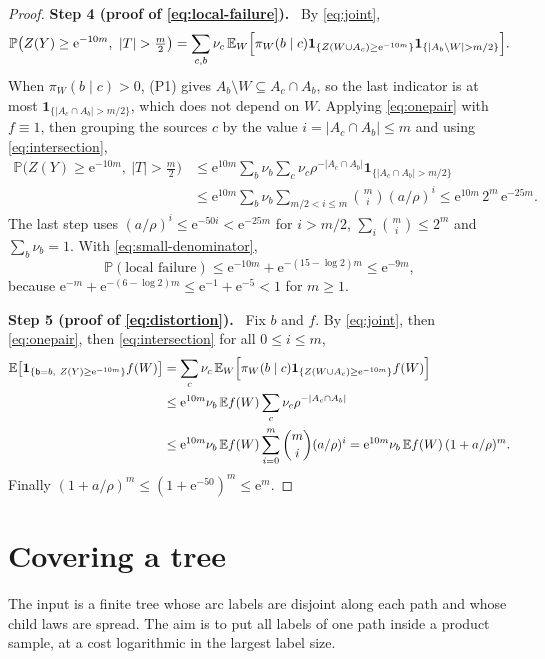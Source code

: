 \documentclass[11pt]{article}
\numberwithin{equation}{section}
\newcommand{\PP}{\mathbb P}
\newcommand{\EE}{\mathbb E}
\newcommand{\ind}{\mathbf 1}
\newcommand{\ee}{\mathrm e}
\newcommand{\tgt}{\mathsf b}
\newcommand{\step}[2]{\par\medskip\noindent\textbf{Step #1 (#2).}\ }
\begin{document}
\begin{proof}
\step{4}{proof of \eqref{eq:local-failure}}
By \eqref{eq:joint},
\[
 \PP\bigl(Z(Y)\ge\ee^{-10m},\ |T|>\tfrac m2\bigr)
 =\sum_{c,b}\nu_c\,\EE_W\Bigl[\pi_W(b\mid c)
   \ind_{\{Z(W\cup A_c)\ge\ee^{-10m}\}}
   \ind_{\{|A_b\setminus W|>m/2\}}\Bigr].
\]
When $\pi_W(b\mid c)>0$, (P1) gives
$A_b\setminus W\subseteq A_c\cap A_b$, so the last indicator is at most
$\ind_{\{|A_c\cap A_b|>m/2\}}$, which does not depend on $W$. Applying
\eqref{eq:onepair} with $f\equiv1$, then grouping the sources $c$ by
the value $i=|A_c\cap A_b|\le m$ and using \eqref{eq:intersection},
\begin{align*}
 \PP\bigl(Z(Y)\ge\ee^{-10m},\ |T|>\tfrac m2\bigr)
 &\le\ee^{10m}\sum_b\nu_b\sum_c\nu_c
 \rho^{-|A_c\cap A_b|}\ind_{\{|A_c\cap A_b|>m/2\}}\\
 &\le\ee^{10m}\sum_b\nu_b\sum_{m/2<i\le m}\binom mi(a/\rho)^i
 \le \ee^{10m}\,2^m\,\ee^{-25m}.
\end{align*}
The last step uses $(a/\rho)^i\le\ee^{-50i}<\ee^{-25m}$ for $i>m/2$,
$\sum_i\binom mi\le2^m$ and $\sum_b\nu_b=1$. With
\eqref{eq:small-denominator},
\[
 \PP(\text{local failure})
 \le\ee^{-10m}+\ee^{-(15-\log 2)m}
 \le\ee^{-9m},
\]
because $\ee^{-m}+\ee^{-(6-\log2)m}\le\ee^{-1}+\ee^{-5}<1$ for
$m\ge1$.

\step{5}{proof of \eqref{eq:distortion}}
Fix $b$ and $f$. By \eqref{eq:joint}, then \eqref{eq:onepair}, then
\eqref{eq:intersection} for all $0\le i\le m$,
\begin{align*}
 \EE\!\left[
 \ind_{\{\tgt=b,\ Z(Y)\ge\ee^{-10m}\}} f(W)\right]
 &=\sum_c\nu_c\,\EE_W\Bigl[\pi_W(b\mid c)
   \ind_{\{Z(W\cup A_c)\ge\ee^{-10m}\}}f(W)\Bigr]\\
 &\le\ee^{10m}\nu_b\,\EE f(W)\sum_c\nu_c\rho^{-|A_c\cap A_b|}\\
 &\le\ee^{10m}\nu_b\,\EE f(W)\sum_{i=0}^m\binom mi(a/\rho)^i
 =\ee^{10m}\nu_b\,\EE f(W)\,(1+a/\rho)^m .
\end{align*}
Finally $(1+a/\rho)^m\le(1+\ee^{-50})^m\le\ee^m$.
\end{proof}

\section{Covering a tree}\label{sec:trees}

The input is a finite tree whose arc labels are disjoint along each
path and whose child laws are spread. The aim is to put all labels of
one path inside a product sample, at a cost logarithmic in the largest
label size.
\end{document}
